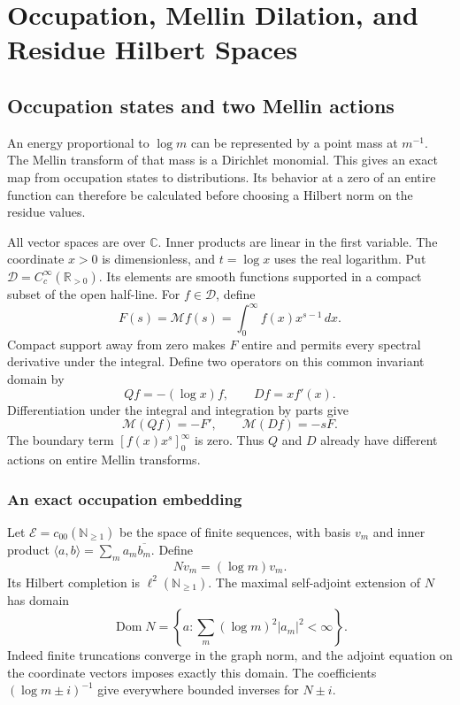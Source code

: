 \section{Occupation, Mellin Dilation, and Residue Hilbert Spaces}
\label{v4-arith:mo:chapter}

\subsection{Occupation states and two Mellin actions}

An energy proportional to $\log m$ can be represented by a point
mass at $m^{-1}$. The Mellin transform of that mass is a Dirichlet
monomial. This gives an exact map from occupation states to
distributions. Its behavior at a zero of an entire function can
therefore be calculated before choosing a Hilbert norm on the
residue values.

All vector spaces are over $\mathbb C$. Inner products are linear
in the first variable. The coordinate $x>0$ is dimensionless,
and $t=\log x$ uses the real logarithm. Put
$\mathscr D=C_c^\infty(\mathbb R_{>0})$. Its elements are smooth
functions supported in a compact subset of the open half-line.
For $f\in\mathscr D$, define
\[
 F(s)=\mathcal Mf(s)=\int_0^\infty f(x)x^{s-1}\,dx.
\]
Compact support away from zero makes $F$ entire and permits every
spectral derivative under the integral. Define two operators on
this common invariant domain by
\[
 Qf=-(\log x)f,\qquad Df=x f'(x).
\]
Differentiation under the integral and integration by parts give
\begin{equation}
 \mathcal M(Qf)=-F',\qquad \mathcal M(Df)=-sF.
 \label{v4-arith:mo:two-actions}
\end{equation}
The boundary term $[f(x)x^s]_0^\infty$ is zero. Thus $Q$ and $D$
already have different actions on entire Mellin transforms.

\subsubsection{An exact occupation embedding}

Let $\mathscr E=c_{00}(\mathbb N_{\geq1})$ be the space of finite
sequences, with basis $v_m$ and inner product
$\langle a,b\rangle=\sum_m a_m\overline{b_m}$. Define
\[
 Nv_m=(\log m)v_m.
\]
Its Hilbert completion is $\ell^2(\mathbb N_{\geq1})$. The maximal
self-adjoint extension of $N$ has domain
\[
 \operatorname{Dom}N=
 \left\{a:\sum_m(\log m)^2|a_m|^2<\infty\right\}.
\]
Indeed finite truncations converge in the graph norm, and the
adjoint equation on the coordinate vectors imposes exactly this
domain. The coefficients $(\log m\pm i)^{-1}$ give everywhere
bounded inverses for $N\pm i$.

